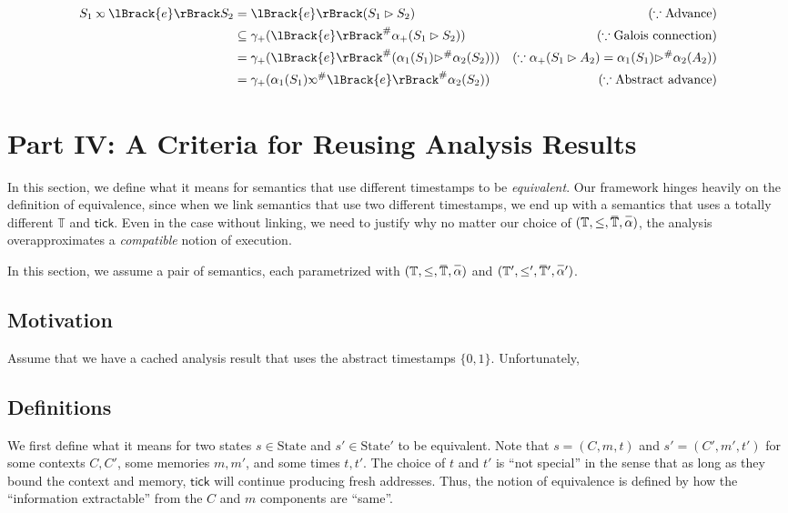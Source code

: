 \documentclass{article}
\theoremstyle{definition}
\def\ovbarw{1.2mu}
\def\ovbarh{1}
\newcommand*{\ovbar}[1]{\mkern \ovbarw\overline{\mkern-\ovbarw{\smash{#1}\scalebox{1}[\ovbarh]{\vphantom{i}}}\mkern-\ovbarw}\mkern \ovbarw}
\newcommand*{\A}[1]{\ovbar{#1}}
\newcommand*{\Abs}[1]{{#1}^{\#}}
\newcommand*{\Time}{\mathbb{T}}
\newcommand*{\ATime}{\A{\Time}}
\newcommand*{\mem}{m}
\newcommand*{\State}{\text{State}}
\newcommand*{\semlink}{\mathbin{\rotatebox[origin=c]{180}{$\propto$}}}
\newcommand*{\sembracket}[1]{\lBrack{#1}\rBrack}
\newcommand*{\tick}{\mathsf{tick}}
\begin{document}
\begin{align*}
  S_1\semlink\sembracket{e}S_2 & =\sembracket{e}(S_1\rhd S_2)                                          & (\because\text{Advance})                                           \\
                               & \subseteq\gamma_+(\Abs{\sembracket{e}}\alpha_+(S_1\rhd S_2))          & (\because\text{Galois connection})                                 \\
                               & =\gamma_+(\Abs{\sembracket{e}}(\alpha_1(S_1)\Abs\rhd\alpha_2(S_2)))   & (\because\alpha_+(S_1\rhd A_2)=\alpha_1(S_1)\Abs\rhd\alpha_2(A_2)) \\
                               & =\gamma_+(\alpha_1(S_1)\Abs\semlink\Abs{\sembracket{e}}\alpha_2(S_2)) & (\because\text{Abstract advance})
\end{align*}
\section{Part IV: A Criteria for Reusing Analysis Results}
In this section, we define what it means for semantics that use different timestamps to be \emph{equivalent}.
Our framework hinges heavily on the definition of equivalence, since when we link semantics that use two different timestamps, we end up with a semantics that uses a totally different $\Time$ and $\tick$.
Even in the case without linking, we need to justify why no matter our choice of $(\Time,\le,\ATime,\A\alpha)$, the analysis overapproximates a \emph{compatible} notion of execution.

In this section, we assume a pair of semantics, each parametrized with $(\Time,\le,\ATime,\A\alpha)$ and $(\Time',\le',\ATime',\A\alpha')$.
\subsection{Motivation}
Assume that we have a cached analysis result that uses the abstract timestamps $\{0,1\}$.
Unfortunately, 

\subsection{Definitions}
We first define what it means for two states $s\in\State$ and $s'\in\State'$ to be equivalent.
Note that $s=(C,\mem,t)$ and $s'=(C',\mem',t')$ for some contexts $C,C'$, some memories $\mem,\mem'$, and some times $t,t'$.
The choice of $t$ and $t'$ is ``not special'' in the sense that as long as they bound the context and memory, $\tick$ will continue producing fresh addresses.
Thus, the notion of equivalence is defined by how the ``information extractable'' from the $C$ and $\mem$ components are ``same''.
\end{document}

